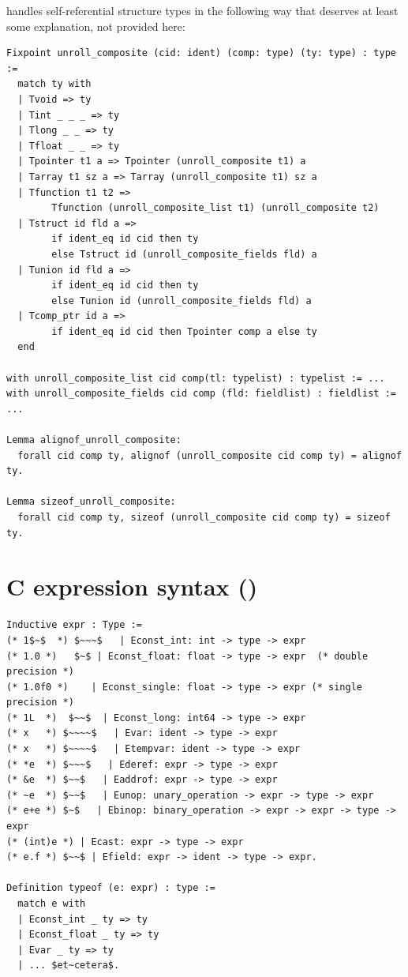 \documentclass[12pt,fleqn,openany,oneside,showtrims]{memoir}
\newcommand{\ychapter}[2]{\chapter[#1]{#1 \hfill \normalsize #2}}
\begin{document}
\clearpage
{} handles self-referential structure types
in the following way that deserves at least some explanation,
not provided here:
\begin{lstlisting}
Fixpoint unroll_composite (cid: ident) (comp: type) (ty: type) : type :=
  match ty with
  | Tvoid => ty
  | Tint _ _ _ => ty
  | Tlong _ _ => ty
  | Tfloat _ _ => ty
  | Tpointer t1 a => Tpointer (unroll_composite t1) a
  | Tarray t1 sz a => Tarray (unroll_composite t1) sz a
  | Tfunction t1 t2 =>
        Tfunction (unroll_composite_list t1) (unroll_composite t2)
  | Tstruct id fld a =>
        if ident_eq id cid then ty
        else Tstruct id (unroll_composite_fields fld) a
  | Tunion id fld a =>
        if ident_eq id cid then ty
        else Tunion id (unroll_composite_fields fld) a
  | Tcomp_ptr id a =>
        if ident_eq id cid then Tpointer comp a else ty
  end

with unroll_composite_list cid comp(tl: typelist) : typelist := ...
with unroll_composite_fields cid comp (fld: fieldlist) : fieldlist := ...

Lemma alignof_unroll_composite:
  forall cid comp ty, alignof (unroll_composite cid comp ty) = alignof ty.

Lemma sizeof_unroll_composite:
  forall cid comp ty, sizeof (unroll_composite cid comp ty) = sizeof ty.
\end{lstlisting}
\ychapter{C expression syntax}{(\file{compcert/cfrontend/Clight.v})}

\begin{lstlisting}
Inductive expr : Type :=
(* 1$~$  *) $~~~$   | Econst_int: int -> type -> expr
(* 1.0 *)   $~$ | Econst_float: float -> type -> expr  (* double precision *)
(* 1.0f0 *)    | Econst_single: float -> type -> expr (* single precision *)
(* 1L  *)  $~~$  | Econst_long: int64 -> type -> expr
(* x   *) $~~~~$   | Evar: ident -> type -> expr
(* x   *) $~~~~$   | Etempvar: ident -> type -> expr
(* *e  *) $~~~$   | Ederef: expr -> type -> expr
(* &e  *) $~~$   | Eaddrof: expr -> type -> expr
(* ~e  *) $~~$   | Eunop: unary_operation -> expr -> type -> expr
(* e+e *) $~$   | Ebinop: binary_operation -> expr -> expr -> type -> expr
(* (int)e *) | Ecast: expr -> type -> expr
(* e.f *) $~~$ | Efield: expr -> ident -> type -> expr.

Definition typeof (e: expr) : type :=
  match e with
  | Econst_int _ ty => ty
  | Econst_float _ ty => ty
  | Evar _ ty => ty
  | ... $et~cetera$.
\end{lstlisting}
\end{document}
